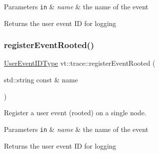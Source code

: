 \begin{DoxyParams}[1]{Parameters}
\mbox{\tt in}  & {\em name} & the name of the event\\
\hline
\end{DoxyParams}
\begin{DoxyReturn}{Returns}
the user event ID for logging 
\end{DoxyReturn}
\mbox{\label{namespacevt_1_1trace_a0cacc6989895f36e577db51e16df1e23}} 
\subsubsection{\texorpdfstring{register\+Event\+Rooted()}{registerEventRooted()}}
{\footnotesize\ttfamily \hyperlink{namespacevt_1_1trace_a5908920d051c144c89f17c69ed262350}{User\+Event\+I\+D\+Type} vt\+::trace\+::register\+Event\+Rooted (\begin{DoxyParamCaption}\item[{std\+::string const \&}]{name }\end{DoxyParamCaption})}



Register a user event (rooted) on a single node. 


\begin{DoxyParams}[1]{Parameters}
\mbox{\tt in}  & {\em name} & the name of the event\\
\hline
\end{DoxyParams}
\begin{DoxyReturn}{Returns}
the user event ID for logging 
\end{DoxyReturn}
